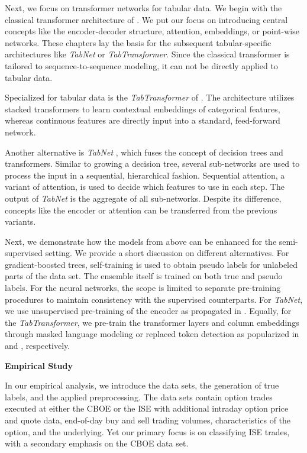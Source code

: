 Next, we focus on transformer networks for tabular data. We begin with the classical transformer architecture of \textcite{vaswaniAttentionAllYou2017}. We put our focus on introducing central concepts like the encoder-decoder structure, attention, embeddings, or point-wise networks. These chapters lay the basis for the subsequent tabular-specific architectures like \emph{TabNet} or \emph{TabTransformer}. Since the classical transformer is tailored to sequence-to-sequence modeling, it can not be directly applied to tabular data.

Specialized for tabular data is the \emph{TabTransformer} of \textcite{huangTabTransformerTabularData2020}. The architecture utilizes stacked transformers to learn contextual embeddings of categorical features, whereas continuous features are directly input into a standard, feed-forward network.

Another alternative is \emph{TabNet} \autocite{arikTabNetAttentiveInterpretable2020}, which fuses the concept of decision trees and transformers. Similar to growing a decision tree, several sub-networks are used to process the input in a sequential, hierarchical fashion. Sequential attention, a variant of attention, is used to decide which features to use in each step. The output of \emph{TabNet} is the aggregate of all sub-networks. Despite its difference, concepts like the encoder or attention can be transferred from the previous variants. 

Next, we demonstrate how the models from above can be enhanced for the semi-supervised setting. We provide a short discussion on different alternatives. For gradient-boosted trees, self-training \autocite{yarowskyUnsupervisedWordSense1995} is used to obtain pseudo labels for unlabeled parts of the data set. The ensemble itself is trained on both true and pseudo labels. For the neural networks, the scope is limited to separate pre-training procedures to maintain consistency with the supervised counterparts. For \emph{TabNet}, we use unsupervised pre-training of the encoder as propagated in \textcite{arikTabNetAttentiveInterpretable2020}. Equally, for the \emph{TabTransformer}, we pre-train the transformer layers and column embeddings through masked language modeling or replaced token detection as popularized in \textcite{devlinBERTPretrainingDeep2019} and \textcite{clarkELECTRAPretrainingText2020}, respectively. 

\textbf{Empirical Study}

In our empirical analysis, we introduce the data sets, the generation of true labels, and the applied preprocessing. The data sets contain option trades executed at either the \gls{CBOE} or the \gls{ISE} with additional intraday option price and quote data, end-of-day buy and sell trading volumes, characteristics of the option, and the underlying. Yet our primary focus is on classifying \gls{ISE} trades, with a secondary emphasis on the \gls{CBOE} data set. 

